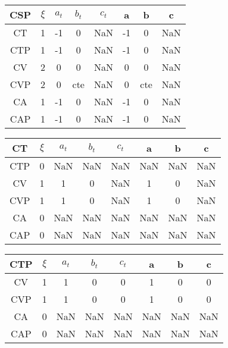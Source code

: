 \documentclass[twocolumn]{article}
\begin{document}
\begin{table}[H]
	\begin{tabular}{|c|c|c|c|c|c|c|c|}
		\hline
		CSP & $\xi $& $a_t$ & $b_t$ & $c_t$ & a & b & c \\
		\hline
		CT & 1 & -1  & 0  & NaN  & -1  & 0  & NaN  \\
		\hline
		CTP & 1 &  -1 &  0 &  NaN & -1  & 0  & NaN  \\
		\hline
		CV &  2 & 0  &  0 & NaN & 0 & 0  & NaN  \\
		\hline
		CVP & 2  & 0  & cte  & NaN  & 0  & cte  & NaN  \\
		\hline
		CA & 1 & -1  & 0  & NaN  & -1  & 0  & NaN  \\
		\hline
		CAP & 1 &  -1  &  0 &  NaN &  -1 & 0  & NaN  \\
		\hline
	\end{tabular}
\end{table}

\begin{table}[H]
	\begin{tabular}{|c|c|c|c|c|c|c|c|}
		\hline
		CT & $\xi $& $a_t$ & $b_t$ & $c_t$ & a & b & c \\
		\hline
		CTP & 0 & NaN  &  NaN & NaN   & NaN  &  NaN & NaN \\
		\hline 
		CV & 1 & 1  & 0  & NaN   & 1  &  0 & NaN  \\
		\hline
		CVP & 1 & 1 & 0  &  NaN  & 1  &  0 & NaN  \\
		\hline
		CA & 0 & NaN & NaN  &  NaN  & NaN  &  NaN & NaN   \\
		\hline
		CAP & 0 &  NaN & NaN  & NaN   & NaN  &  NaN & NaN  \\
		\hline
	\end{tabular}
\end{table}

\begin{table}[H]
	\begin{tabular}{|c|c|c|c|c|c|c|c|}
		\hline
		CTP & $\xi $& $a_t$ & $b_t$ & $c_t$ & a & b & c \\
		\hline
		CV & 1 &  1 & 0  & 0  & 1  & 0  & 0  \\
		\hline
		CVP & 1 & 1  & 0  & 0  & 1  &  0 & 0  \\
		\hline
		CA & 0 & NaN  & NaN  & NaN   & NaN  &  NaN & NaN    \\
		\hline
		CAP & 0 & NaN  & NaN  & NaN   & NaN  &  NaN & NaN    \\
		\hline
	\end{tabular}
\end{table}
\end{document}
